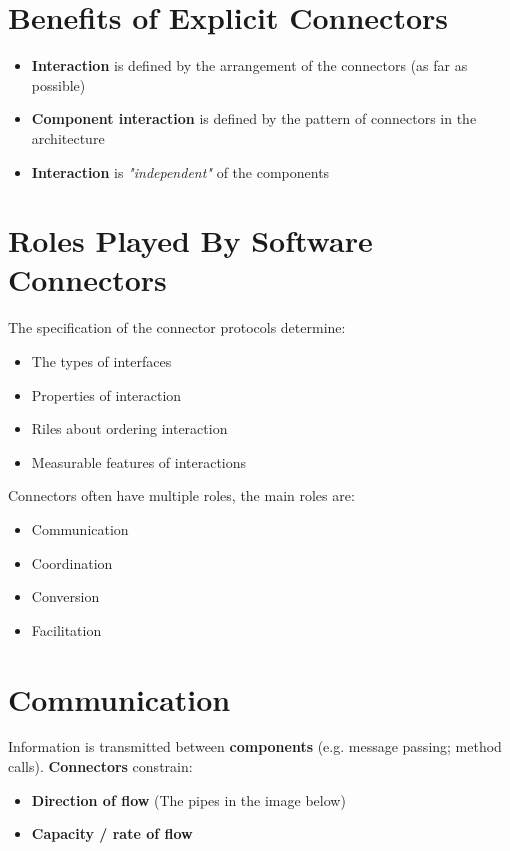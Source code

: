 \documentclass[a4paper]{report}
\begin{document}
\section{Benefits of Explicit Connectors}
\begin{itemize}
\item \textbf{Interaction} is defined by the arrangement of the connectors (as far as possible)
\item \textbf{Component interaction} is defined by the pattern of connectors in the architecture
\item \textbf{Interaction} is \textit{"independent"} of the components
\end{itemize}

\section{Roles Played By Software Connectors}
The specification of the connector protocols determine:
\begin{itemize}
\item The types of interfaces
\item Properties of interaction
\item Riles about ordering interaction
\item Measurable features of interactions\\
\end{itemize}

Connectors often have multiple roles, the main roles are:
\begin{itemize}
\item Communication
\item Coordination
\item Conversion
\item Facilitation
\end{itemize}

\section{Communication}
Information is transmitted between \textbf{components} (e.g. message passing; method calls). \textbf{Connectors} constrain:
\begin{itemize}
\item \textbf{Direction of flow }(The pipes in the image below)
\item \textbf{Capacity / rate of flow}\\
\end{itemize}
\end{document}
